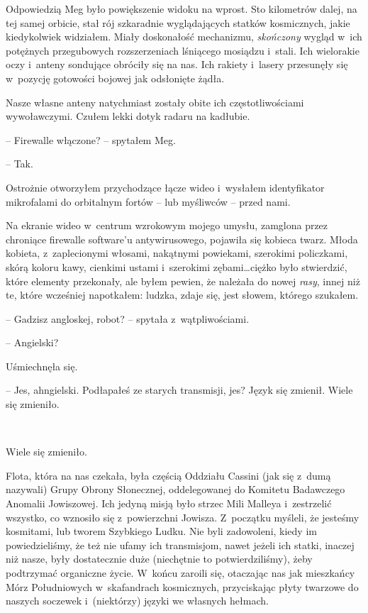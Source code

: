 \documentclass[oneside,polish,11pt,sfheadings]{mwbk}
\begin{document}
Odpowiedzią Meg było powiększenie widoku na wprost. Sto kilometrów
dalej, na tej samej orbicie, stał rój szkaradnie wyglądających statków
kosmicznych, jakie kiedykolwiek widziałem. Miały doskonałość mechanizmu,
\emph{skończony} wygląd w~ich potężnych przegubowych rozszerzeniach
lśniącego mosiądzu i~stali. Ich wielorakie oczy i~anteny sondujące
obróciły się na nas. Ich rakiety i~lasery przesunęły się w~pozycję
gotowości bojowej jak odsłonięte żądła.

Nasze własne anteny natychmiast zostały obite ich częstotliwościami
wywoławczymi. Czułem lekki dotyk radaru na kadłubie.

-- Firewalle włączone? -- spytałem Meg.

-- Tak.

Ostrożnie otworzyłem przychodzące łącze wideo i~wysłałem identyfikator
mikrofalami do orbitalnym fortów -- lub myśliwców -- przed nami.

Na ekranie wideo w~centrum wzrokowym mojego umysłu, zamglona przez
chroniące firewalle software'u antywirusowego, pojawiła się kobieca
twarz. Młoda kobieta, z~zaplecionymi włosami, nakątnymi powiekami,
szerokimi policzkami, skórą koloru kawy, cienkimi ustami i~szerokimi
zębami\ldots ciężko było stwierdzić, które elementy przekonały, ale byłem
pewien, że należała do nowej \emph{rasy}, innej niż te, które wcześniej
napotkałem: ludzka, zdaje się, jest słowem, którego szukałem.

-- Gadzisz angloskej, robot? -- spytała z~wątpliwościami.

-- Angielski?

Uśmiechnęła się. 

-- Jes, ahngielski. Podłapałeś ze starych transmisji,
jes? Język się zmienił. Wiele się zmieniło.

~

Wiele się zmieniło.

Flota, która na nas czekała, była częścią Oddziału Cassini (jak się z~dumą nazywali) Grupy Obrony Słonecznej, oddelegowanej do Komitetu
Badawczego Anomalii Jowiszowej. Ich jedyną misją było strzec Mili
Malleya i~zestrzelić wszystko, co wznosiło się z~powierzchni Jowisza. Z~początku myśleli, że jesteśmy kosmitami, lub tworem Szybkiego Ludku. Nie
byli zadowoleni, kiedy im powiedzieliśmy, że też nie ufamy ich
transmisjom, nawet jeżeli ich statki, inaczej niż nasze, były
dostatecznie duże (niechętnie to potwierdziliśmy), żeby podtrzymać
organiczne życie. W~końcu zaroili się, otaczając nas jak mieszkańcy Mórz
Południowych w~skafandrach kosmicznych, przyciskając płyty twarzowe do
naszych soczewek i~(niektórzy) języki we własnych hełmach.
\end{document}
